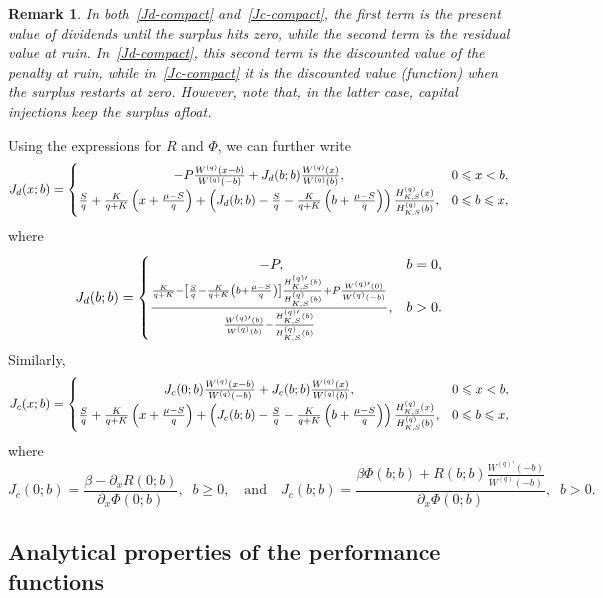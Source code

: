 \documentclass[11pt,reqno]{amsart}
\newtheorem{remark}[theorem]{Remark}
\newcommand{\Wq}{W^{(q)}}
\newcommand{\Wqprime}{W^{(q) \prime}}
\newcommand{\Hq}{H^{(q)}_{K,S}}
\newcommand{\Hqprime}{H^{(q) \prime}_{K,S}}
\newcommand{\delx}{\partial_x}
\newcommand{\ettap}[1]{\frac{S}{q} + \frac{K}{q+K}\left(#1 + \frac{\mu - S}{q}\right)}
\newcommand{\ettam}[1]{\frac{S}{q} - \frac{K}{q+K}\left(#1 + \frac{\mu - S}{q}\right)}
\renewcommand{\geq}{\geqslant}
\renewcommand{\leq}{\leqslant}
\begin{document}
\begin{remark}
In both~\eqref{Jd-compact} and~\eqref{Jc-compact}, the first term is the present value of dividends until the surplus hits zero, while the second term is the residual value at ruin. In~\eqref{Jd-compact}, this second term is the discounted value of the penalty at ruin, while in~\eqref{Jc-compact} it is the discounted value (function) when the surplus restarts at zero. However, note that, in the latter case, capital injections keep the surplus afloat.
\end{remark}

Using the expressions for $R$ and $\Phi$, we can further write
\begin{equation}\label{Jd-byparts}
    J_d(x;b) =
    \begin{cases}
        \hfil -P\frac{\Wq(x-b)}{\Wq(-b)} + J_d(b;b)\frac{\Wq(x)}{\Wq(b)}, &0\leq x < b, \\
        \ettap{x} + \left(J_d(b;b) - \ettam{b} \right) \frac{\Hq(x)}{\Hq(b)}, &0\leq b \leq x,
    \end{cases}
\end{equation}
where
\begin{equation}
J_d(b;b) =
    \begin{cases}
        \hfil -P, &b = 0, \\
        \frac{\frac{K}{q+K} - \left[\ettam{b}\right]\frac{\Hqprime(b)}{\Hq(b)} + P \frac{\Wqprime(0)}{\Wq(-b)}}{\frac{\Wqprime(b)}{\Wq(b)}-\frac{\Hqprime(b)}{\Hq(b)}}, &b>0.
    \end{cases}
\end{equation}
Similarly,
\begin{equation}
    J_c(x;b) =
    \begin{cases}
        \hfil J_c(0;b)\frac{\Wq(x-b)}{\Wq(-b)} + J_c(b;b)\frac{\Wq(x)}{\Wq(b)}, &0\leq x < b, \\
        \ettap{x} + \left(J_c(b;b) - \ettam{b}\right)\frac{\Hq(x)}{\Hq(b)}, &0\leq b \leq x,
    \end{cases}
\end{equation}
where
\begin{equation}
    J_c(0;b) = \frac{\beta-\delx R(0;b)}{\delx\Phi(0;b)}, \;\; b\geq 0, \quad \text{and} \quad J_c(b;b) = \frac{\beta\Phi(b;b) + R(b;b)\frac{\Wqprime (-b)}{\Wq(-b)}}{\delx\Phi(0;b)}, \;\; b>0.
\end{equation}


\subsection{Analytical properties of the performance functions}\label{subsec:J-prop}
\end{document}
